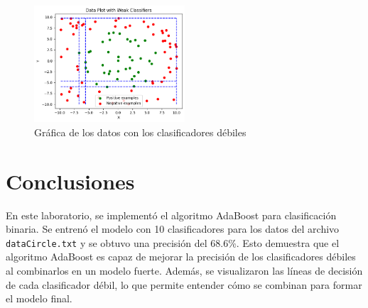 \documentclass{article}
\begin{document}
    \begin{figure}[h]
        \centering
        \includegraphics[width=0.5\textwidth]{img/data_plot_weak_classifiers}
        \caption{Gráfica de los datos con los clasificadores débiles}
        \label{fig:data_plot_weak_classifiers}
    \end{figure}

    \section{Conclusiones}\label{sec:conclusiones}
    \newline
    En este laboratorio, se implementó el algoritmo AdaBoost para clasificación binaria.
    Se entrenó el modelo con 10 clasificadores para los datos del archivo \texttt{dataCircle.txt} y se obtuvo una precisión del 68.6\%.
    Esto demuestra que el algoritmo AdaBoost es capaz de mejorar la precisión de los clasificadores débiles al combinarlos en un modelo fuerte.
    Además, se visualizaron las líneas de decisión de cada clasificador débil, lo que permite entender cómo se combinan para formar el modelo final.
\end{document}
